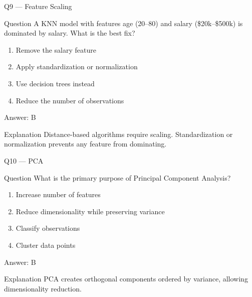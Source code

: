 \documentclass[aspectratio=169,8pt]{beamer}
\begin{document}
	\begin{frame}{Q9 --- Feature Scaling}
		\begin{block}{Question}
			A KNN model with features age (20–80) and salary (\$20k–\$500k) is dominated by salary. What is the best fix?
		\end{block}
		\begin{enumerate}
			\item Remove the salary feature
			\item Apply standardization or normalization
			\item Use decision trees instead
			\item Reduce the number of observations
		\end{enumerate}
		\begin{exampleblock}{Answer: B}\end{exampleblock}
		\begin{block}{Explanation}
			Distance-based algorithms require scaling. Standardization or normalization prevents any feature from dominating.
		\end{block}
	\end{frame}
	
	\begin{frame}{Q10 --- PCA}
		\begin{block}{Question}
			What is the primary purpose of Principal Component Analysis?
		\end{block}
		\begin{enumerate}
			\item Increase number of features
			\item Reduce dimensionality while preserving variance
			\item Classify observations
			\item Cluster data points
		\end{enumerate}
		\begin{exampleblock}{Answer: B}\end{exampleblock}
		\begin{block}{Explanation}
			PCA creates orthogonal components ordered by variance, allowing dimensionality reduction.
		\end{block}
	\end{frame}
	
\end{document}
